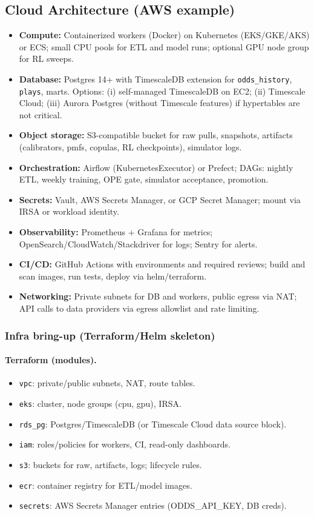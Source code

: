 \subsection{Cloud Architecture (AWS example)}
\begin{itemize}
  \item \textbf{Compute:} Containerized workers (Docker) on Kubernetes (EKS/GKE/AKS) or ECS; small CPU pools for ETL and model runs; optional GPU node group for RL sweeps.
  \item \textbf{Database:} Postgres 14+ with TimescaleDB extension for \texttt{odds\_history}, \texttt{plays}, marts. Options: (i) self-managed TimescaleDB on EC2; (ii) Timescale Cloud; (iii) Aurora Postgres (without Timescale features) if hypertables are not critical.
  \item \textbf{Object storage:} S3-compatible bucket for raw pulls, snapshots, artifacts (calibrators, pmfs, copulas, RL checkpoints), simulator logs.
  \item \textbf{Orchestration:} Airflow (KubernetesExecutor) or Prefect; DAGs: nightly ETL, weekly training, OPE gate, simulator acceptance, promotion.
  \item \textbf{Secrets:} Vault, AWS Secrets Manager, or GCP Secret Manager; mount via IRSA or workload identity.
  \item \textbf{Observability:} Prometheus + Grafana for metrics; OpenSearch\slash{}CloudWatch\slash{}Stackdriver for logs; Sentry for alerts.
  \item \textbf{CI/CD:} GitHub Actions with environments and required reviews; build and scan images, run tests, deploy via helm/terraform.
  \item \textbf{Networking:} Private subnets for DB and workers, public egress via NAT; API calls to data providers via egress allowlist and rate limiting.
\end{itemize}

\subsubsection*{Infra bring-up (Terraform/Helm skeleton)}
\paragraph{Terraform (modules).}
\begin{itemize}
  \item \texttt{vpc}: private/public subnets, NAT, route tables.
  \item \texttt{eks}: cluster, node groups (cpu, gpu), IRSA.
  \item \texttt{rds\_pg}: Postgres/TimescaleDB (or Timescale Cloud data source block).
  \item \texttt{iam}: roles/policies for workers, CI, read-only dashboards.
  \item \texttt{s3}: buckets for raw, artifacts, logs; lifecycle rules.
  \item \texttt{ecr}: container registry for ETL/model images.
  \item \texttt{secrets}: AWS Secrets Manager entries (ODDS\_API\_KEY, DB creds).
\end{itemize}
